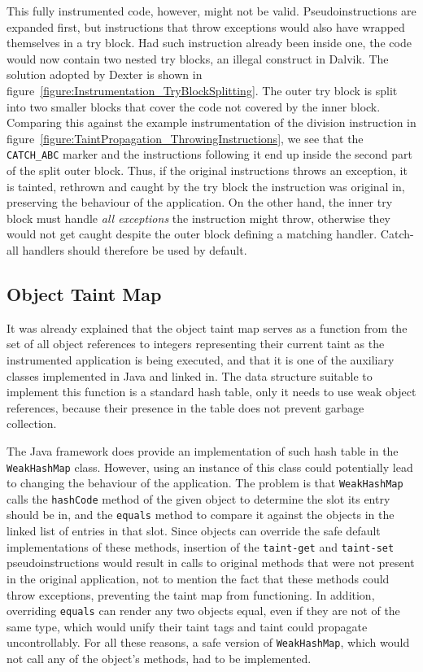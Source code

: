 \documentclass[12pt,twoside,notitlepage]{report}
\begin{document}
This fully instrumented code, however, might not be valid. Pseudoinstructions are expanded first, but instructions that throw exceptions would also have wrapped themselves in a try block. Had such instruction already been inside one, the code would now contain two nested try blocks, an illegal construct in Dalvik. The solution adopted by Dexter is shown in figure~\ref{figure:Instrumentation_TryBlockSplitting}. The outer try block is split into two smaller blocks that cover the code not covered by the inner block. Comparing this against the example instrumentation of the division instruction in figure~\ref{figure:TaintPropagation_ThrowingInstructions}, we see that the \verb$CATCH_ABC$ marker and the instructions following it end up inside the second part of the split outer block. Thus, if the original instructions throws an exception, it is tainted, rethrown and caught by the try block the instruction was original in, preserving the behaviour of the application. On the other hand, the inner try block must handle \emph{all exceptions} the instruction might throw, otherwise they would not get caught despite the outer block defining a matching handler. Catch-all handlers should therefore be used by default.

\label{section:Code_MethodEntering}

\subsection{Object Taint Map}

It was already explained that the object taint map serves as a function from the set of all object references to integers representing their current taint as the instrumented application is being executed, and that it is one of the auxiliary classes implemented in Java and linked in. The data structure suitable to implement this function is a standard hash table, only it needs to use weak object references, because their presence in the table does not prevent garbage collection.

The Java framework does provide an implementation of such hash table in the \verb$WeakHashMap$ class. However, using an instance of this class could potentially lead to changing the behaviour of the application. The problem is that \verb$WeakHashMap$ calls the \verb$hashCode$ method of the given object to determine the slot its entry should be in, and the \verb$equals$ method to compare it against the objects in the linked list of entries in that slot. Since objects can override the safe default implementations of these methods, insertion of the \verb$taint-get$ and \verb$taint-set$ pseudoinstructions would result in calls to original methods that were not present in the original application, not to mention the fact that these methods could throw exceptions, preventing the taint map from functioning. In addition, overriding \verb$equals$ can render any two objects equal, even if they are not of the same type, which would unify their taint tags and taint could propagate uncontrollably. For all these reasons, a safe version of \verb$WeakHashMap$, which would not call any of the object's methods, had to be implemented. 
\end{document}
